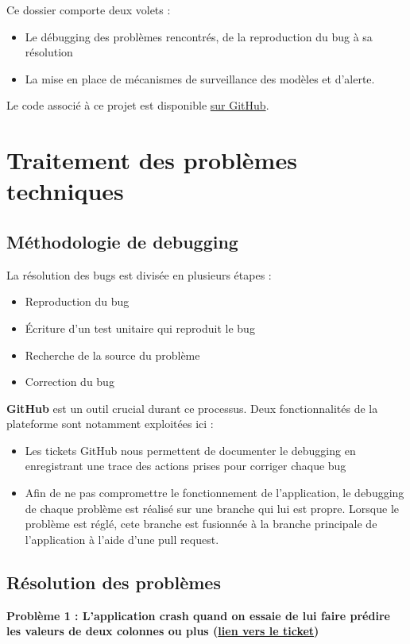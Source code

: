 \documentclass[french]{article}
\begin{document}
    Ce dossier comporte deux volets :
    \begin{itemize}
        \item Le débugging des problèmes rencontrés, de la reproduction du bug à sa résolution
        \item La mise en place de mécanismes de surveillance des modèles et d'alerte.
    \end{itemize}
    Le code associé à ce projet est disponible \href{https://github.com/vinpap/mathfinder}{sur GitHub}.

    \section{Traitement des problèmes techniques}
    \subsection{Méthodologie de debugging}
    La résolution des bugs est divisée en plusieurs étapes :
    \begin{itemize}
        \item Reproduction du bug
        \item Écriture d'un test unitaire qui reproduit le bug
        \item Recherche de la source du problème
        \item Correction du bug
    \end{itemize}
    \textbf{GitHub} est un outil crucial durant ce processus. Deux fonctionnalités de la plateforme sont notamment exploitées ici :
    \begin{itemize}
        \item Les tickets GitHub nous permettent de documenter le debugging en enregistrant une trace des actions prises pour corriger chaque bug
        \item Afin de ne pas compromettre le fonctionnement de l'application, le debugging de chaque problème est réalisé sur une branche qui lui est propre. Lorsque le problème est réglé, cete branche est fusionnée à la branche principale de l'application à l'aide d'une pull request.
    \end{itemize}
    \subsection{Résolution des problèmes}
    \textbf{Problème 1 : L'application crash quand on essaie de lui faire prédire les valeurs de deux colonnes ou plus (\href{https://github.com/vinpap/mathfinder/issues/2}{lien vers le ticket})}
\end{document}
